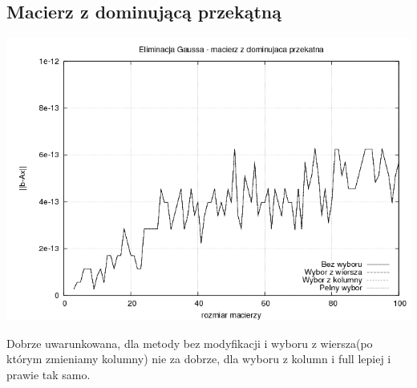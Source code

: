 \documentclass[a4paper,10pt]{article}
\begin{document}
    \subsection{Macierz z dominującą przekątną}
        \begin{center}
            \includegraphics[width=140mm]{dominating_plot.png}
        \end{center}
        Dobrze uwarunkowana, dla metody bez modyfikacji i wyboru z wiersza(po którym zmieniamy kolumny) nie za dobrze, dla wyboru z kolumn i full lepiej i prawie tak samo.
\end{document}
